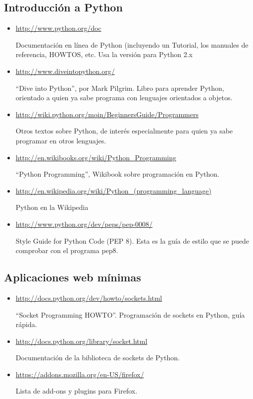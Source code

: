\subsection{Introducción a Python}

\begin{itemize}
\item \url{http://www.python.org/doc}

Documentación en línea de Python (incluyendo un Tutorial, los manuales de referencia, HOWTOS, etc. Usa la versión para Python 2.x

\item \url{http://www.diveintopython.org/}

``Dive into Python'', por Mark Pilgrim. Libro para aprender Python, orientado a quien ya sabe programa con lenguajes orientados a objetos.

\item \url{http://wiki.python.org/moin/BeginnersGuide/Programmers}

Otros textos sobre Python, de interés especialmente para quien ya sabe programar en otros lenguajes.

\item \url{http://en.wikibooks.org/wiki/Python_Programming}

``Python Programming'', Wikibook sobre programación en Python.

\item \url{http://en.wikipedia.org/wiki/Python_(programming_language)}

Python en la Wikipedia

\item \url{http://www.python.org/dev/peps/pep-0008/}

Style Guide for Python Code (PEP 8). Esta es la guía de estilo que se puede comprobar con el programa pep8.
\end{itemize}

\subsection{Aplicaciones web mínimas}

\begin{itemize}
\item \url{http://docs.python.org/dev/howto/sockets.html}

``Socket Programming HOWTO''. Programación de sockets en Python, guía rápida.

\item \url{http://docs.python.org/library/socket.html}

Documentación de la biblioteca de sockets de Python.

\item \url{https://addons.mozilla.org/en-US/firefox/} 

Lista de add-ons y plugins para Firefox.

\end{itemize}

